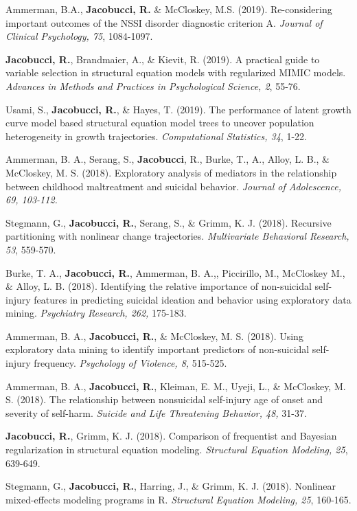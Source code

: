 \documentclass[letterpaper,10pt]{article}
\begin{document}
\begin{etaremune}
	\item  Ammerman, B.A., \textbf{Jacobucci, R.} \& McCloskey, M.S. (2019). Re-considering important outcomes of the NSSI disorder diagnostic criterion A. \emph{Journal of Clinical Psychology, 75}, 1084-1097.
	\item  \textbf{Jacobucci, R.}, Brandmaier, A., \& Kievit, R. (2019). A practical guide to variable selection in structural equation models with regularized MIMIC models. \emph{Advances in Methods and Practices in Psychological Science, 2}, 55-76.  
	\item  Usami, S., \textbf{Jacobucci, R.}, \& Hayes, T. (2019). The performance of latent growth curve model based structural equation model trees to uncover population heterogeneity in growth trajectories. \emph{Computational Statistics, 34}, 1-22.
	\item Ammerman, B. A., Serang, S., \textbf{Jacobucci}, R., Burke, T., A., Alloy, L. B., \& McCloskey, M. S. (2018). Exploratory analysis of mediators in the relationship between childhood maltreatment and suicidal behavior. \emph{Journal of Adolescence, 69, 103-112.}
	\item Stegmann, G., \textbf{Jacobucci, R.}, Serang, S., \& Grimm, K. J. (2018). Recursive partitioning with nonlinear change trajectories. \emph{Multivariate Behavioral Research, 53}, 559-570.
	\item Burke, T. A., \textbf{Jacobucci, R.}, Ammerman, B. A.,, Piccirillo, M., McCloskey M., \& Alloy, L. B. (2018). Identifying the relative importance of non-suicidal self-injury features in predicting suicidal ideation and behavior using exploratory data mining. \emph{Psychiatry Research, 262,} 175-183.
	\item Ammerman, B. A., \textbf{Jacobucci, R.}, \& McCloskey, M. S. (2018). Using exploratory data mining to identify important predictors of non-suicidal self-injury frequency. \emph{Psychology of Violence, 8,} 515-525.
	\item Ammerman, B. A., \textbf{Jacobucci, R.}, Kleiman, E. M., Uyeji, L., \& McCloskey, M. S. (2018). The relationship between nonsuicidal self-injury age of onset and severity of self-harm. \emph{Suicide and Life Threatening Behavior, 48,} 31-37.
	\item  \textbf{Jacobucci, R.}, Grimm, K. J. (2018). Comparison of frequentist and Bayesian regularization in structural equation modeling. \emph{Structural Equation Modeling, 25}, 639-649.
	\item Stegmann, G., \textbf{Jacobucci, R.}, Harring, J., \& Grimm, K. J. (2018). Nonlinear mixed-effects modeling programs in R. \emph{Structural Equation Modeling, 25}, 160-165.

\end{etaremune}
\end{document}
